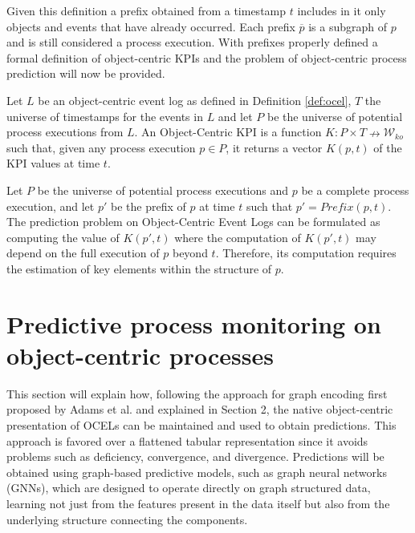         Given this definition a prefix obtained from a timestamp $t$ includes in it only objects and events that have already occurred. Each prefix $\overline{p}$ is a subgraph of $p$ and is still considered a process execution. With prefixes properly defined a formal definition of object-centric KPIs and the problem of object-centric process prediction will now be provided.

        \begin{definition}
        \label{def:ocel_kpi}
        Let $L$ be an object-centric event log as defined in Definition \ref{def:ocel}, $T$ the universe of timestamps for the events in $L$ and let $P$ be the universe of potential process executions from $L$. An Object-Centric KPI is a function $K: P \times T \nrightarrow \mathcal{W}_{ko}$ such that, given any process execution $p\in P$, it returns a vector $K(p,t)$ of the KPI values at time $t$.
        \end{definition}

        \begin{definition}
        \label{def:pred_prob}
            Let $P$ be the universe of potential process executions and $p$ be a complete process execution, and let $p'$ be the prefix of $p$ at time $t$ such that $p' = Prefix(p,t)$. The prediction problem on Object-Centric Event Logs can be formulated as computing the value of $K(p',t)$ where the computation of $K(p',t)$  may depend on the full execution of $p$ beyond $t$. Therefore, its computation requires the estimation of key elements within the structure of $p$.
        \end{definition}
        
    \section{Predictive process monitoring on object-centric processes}
    \label{sec:dataset_GNNS}
        This section will explain how, following the approach for graph encoding first proposed by Adams et al. and explained in Section 2, the native object-centric presentation of OCELs can be maintained and used to obtain predictions. This approach is favored over a flattened tabular representation since it avoids problems such as deficiency, convergence, and divergence. Predictions will be obtained using graph-based predictive models, such as graph neural networks (GNNs), which are designed to operate directly on graph structured data, learning not just from the features present in the data itself but also from the underlying structure connecting the components.

